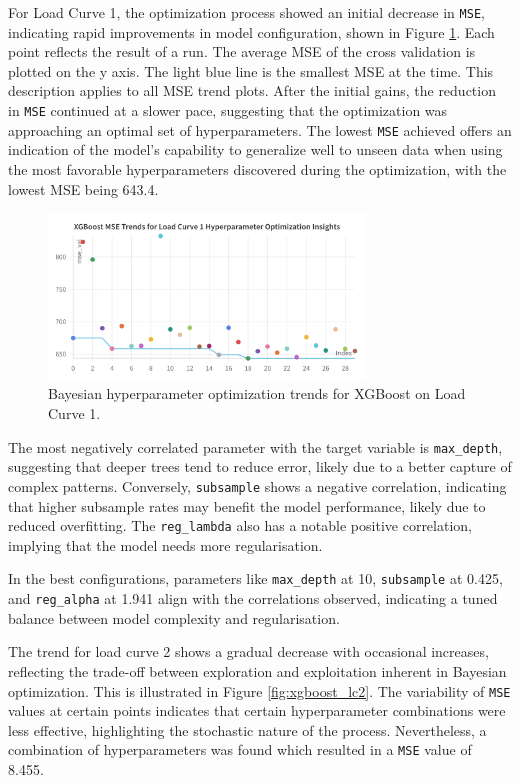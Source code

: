 \documentclass{article} %
\begin{document}
For Load Curve 1, the optimization process showed an initial decrease in \texttt{MSE}, indicating rapid improvements in model configuration, shown in Figure \ref{fig:xgboost_lc1}. Each point reflects the result of a run. The average MSE of the cross validation is plotted on the y axis. The light blue line is the smallest MSE at the time. This description applies to all MSE trend plots. After the initial gains, the reduction in \texttt{MSE} continued at a slower pace, suggesting that the optimization was approaching an optimal set of hyperparameters. The lowest \texttt{MSE} achieved offers an indication of the model's capability to generalize well to unseen data when using the most favorable hyperparameters discovered during the optimization, with the lowest MSE being 643.4. 
\begin{figure}[H]
    \centering
    \includegraphics[width=0.75\textwidth]{ressources/Hyperparams/XGBoost/XGBoost MSE Trends for Load Curve 1 Hyperparameter Optimization Insights.png}
    \caption{Bayesian hyperparameter optimization trends for XGBoost on Load Curve 1.}
    \label{fig:xgboost_lc1}
\end{figure}
The most negatively correlated parameter with the target variable is \texttt{max\_depth}, suggesting that deeper trees tend to reduce error, likely due to a better capture of complex patterns. Conversely, \texttt{subsample} shows a negative correlation, indicating that higher subsample rates may benefit the model performance, likely due to reduced overfitting. The \texttt{reg\_lambda} also has a notable positive correlation, implying that the model needs more regularisation.

In the best configurations, parameters like \texttt{max\_depth} at 10, \texttt{subsample} at 0.425, and \texttt{reg\_alpha} at 1.941 align with the correlations observed, indicating a tuned balance between model complexity and regularisation.

The trend for load curve 2 shows a gradual decrease with occasional increases, reflecting the trade-off between exploration and exploitation inherent in Bayesian optimization. This is illustrated in Figure \ref{fig:xgboost_lc2}. The variability of \texttt{MSE} values at certain points indicates that certain hyperparameter combinations were less effective, highlighting the stochastic nature of the process. Nevertheless, a combination of hyperparameters was found which resulted in a \texttt{MSE} value of 8.455.
\end{document}
